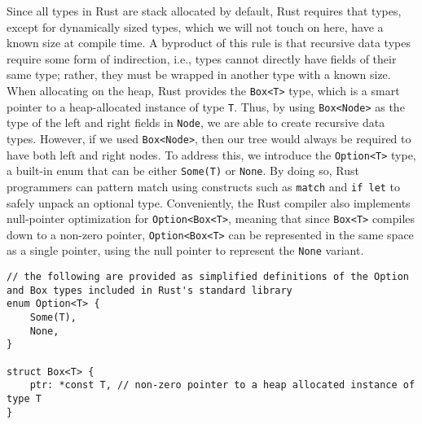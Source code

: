 \documentclass[12pt, letterpaper]{article}
\begin{document}
Since all types in Rust are stack allocated by default\autocite[\href{https://doc.rust-lang.org/rust-by-example/std/box.html}{\S~19.1}]{rust-example}, Rust requires that types, except for dynamically sized types, which we will not touch on here, have a known size at compile time.\autocite[\href{https://doc.rust-lang.org/book/ch20-03-advanced-types.html}{chap.~20~\S~3}]{rust-book} A byproduct of this rule is that recursive data types require some form of indirection, i.e., types cannot directly have fields of their same type; rather, they must be wrapped in another type with a known size.\autocite[\href{https://doc.rust-lang.org/stable/reference/types.html}{\S~10.1}]{rust-reference} When allocating on the heap, Rust provides the \texttt{Box<T>} type, which is a smart pointer to a heap-allocated instance of type \texttt{T}.\autocite[\href{https://doc.rust-lang.org/rust-by-example/std/box.html}{\S~19.1}]{rust-example} Thus, by using \texttt{Box<Node>} as the type of the left and right fields in \texttt{Node}, we are able to create recursive data types. However, if we used \texttt{Box<Node>}, then our tree would always be required to have both left and right nodes. To address this, we introduce the \texttt{Option<T>} type, a built-in enum that can be either \texttt{Some(T)} or \texttt{None}. By doing so, Rust programmers can pattern match using constructs such as \texttt{match} and \texttt{if let} to safely unpack an optional type.\autocite[\href{https://doc.rust-lang.org/book/ch06-00-enums.html}{chap.~6}]{rust-book} Conveniently, the Rust compiler also implements null-pointer optimization for \texttt{Option<Box<T>}, meaning that since \texttt{Box<T>} compiles down to a non-zero pointer, \texttt{Option<Box<T>} can be represented in the same space as a single pointer, using the null pointer to represent the \texttt{None} variant.\autocites{rust-boxed}{rust-option}
\begin{verbatim}
// the following are provided as simplified definitions of the Option and Box types included in Rust's standard library
enum Option<T> {
    Some(T),
    None,
}

struct Box<T> {
    ptr: *const T, // non-zero pointer to a heap allocated instance of type T
}
\end{verbatim}
\end{document}
